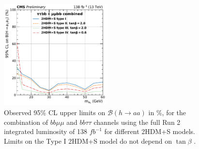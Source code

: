   \begin{figure}[h!]
    \begin{center}
      \includegraphics[width=0.5\textwidth]{figures/ch-10-results/HAA_comb_all_prelim.pdf}
    \end{center}
    \caption[Observed 95\% CL upper limits on $\mathcal{B}(h\to aa)$ in \%, for the combination of $bb\mu\mu$ and $bb\tau\tau$ channels using the full Run 2 integrated luminosity of 138 $fb^{-1}$ for different 2HDM+S models.]{Observed 95\% CL upper limits on $\mathcal{B}(h\to aa)$ in \%, for the combination of $bb\mu\mu$ and $bb\tau\tau$ channels using the full Run 2 integrated luminosity of 138 $fb^{-1}$ for different 2HDM+S models. Limits on the Type I 2HDM+S model do not depend on $\tan\beta$ \cite{CMS-AN-20-213}.}
      \label{fig:results_limits_combined}
  \end{figure}
  



